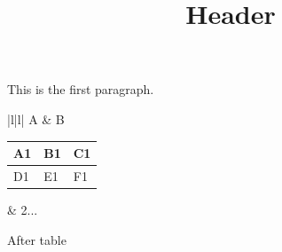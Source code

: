 \documentclass[11pt,a4paper]{article}
\title{Header}
\begin{document}
\maketitle

This is the first paragraph.

\begin{table}[h]
\begin{tabular}{|l|l|}
\hline
A & B \\ \hline
\begin{tabular}{|l|l|l|} \hline A1 & B1 & C1 \\ \hline D1 & E1 & F1 \\ \hline \end{tabular} & 2... \\ \hline
\end{tabular}
\end{table}

After table
\end{document}
